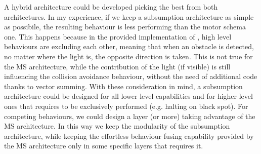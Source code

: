 A hybrid architecture could be developed picking the best from both
architectures. In my experience, if we keep a subsumption architecture as
simple as possibile, the resulting behaviour is less performing than the motor
schema one. This happens because in the provided implementation of
, high level behaviours are excluding each other, meaning
that when an obstacle is detected, no matter where the light is, the opposite
direction is taken. This is not true for the MS architecture, while the
contribution of the light (if visible) is still influencing the collision
avoidance behaviour, without the need of additional code thanks to vector
summing. With these consideration in mind, a subsumption architecture could be
designed for all lower level capabilities and for higher level ones that
requires to be exclusively performed (e.g. halting on black spot). For
competing behaviours, we could design a layer (or more) taking advantage of the
MS architecture.
In this way we keep the modularity of the subsumption architecture, while
keeping the effortless behaviour fusing capability provided by the MS
architecture only in some specific layers that requires it.

